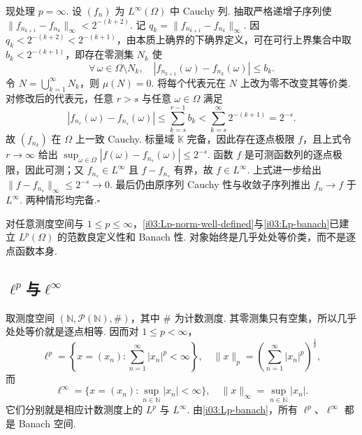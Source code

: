 \begin{FAProof}
现处理 \(\displaystyle p=\infty\). 设 \(\displaystyle (f_n)\) 为 \(\displaystyle L^\infty(\Omega)\) 中 Cauchy 列. 抽取严格递增子序列使 \(\displaystyle \|f_{n_{k+1}}-f_{n_k}\|_\infty<2^{-(k+2)}\).
记 \(\displaystyle q_k=\|f_{n_{k+1}}-f_{n_k}\|_\infty\). 因 \(\displaystyle q_k<2^{-(k+2)}<2^{-(k+1)}\)，由本质上确界的下确界定义，可在可行上界集合中取 \(\displaystyle b_k<2^{-(k+1)}\)，即存在零测集 \(\displaystyle N_k\) 使
\[
\forall\,\omega\in\Omega\setminus N_k,\quad |f_{n_{k+1}}(\omega)-f_{n_k}(\omega)|\leqslant b_k.
\]
令 \(\displaystyle N=\bigcup_{k=1}^{\infty}N_k\)，则 \(\displaystyle \mu(N)=0\). 将每个代表元在 \(\displaystyle N\) 上改为零不改变其等价类. 对修改后的代表元，任意 \(\displaystyle r>s\) 与任意 \(\displaystyle \omega\in\Omega\) 满足
\[
|f_{n_r}(\omega)-f_{n_s}(\omega)|
\leqslant\sum_{k=s}^{r-1}b_k
<\sum_{k=s}^{\infty}2^{-(k+1)}
=2^{-s}.
\]
故 \(\displaystyle (f_{n_k})\) 在 \(\displaystyle \Omega\) 上一致 Cauchy. 标量域 \(\displaystyle \mathbb K\) 完备，因此存在逐点极限 \(\displaystyle f\)，且上式令 \(\displaystyle r\to\infty\) 给出
\(\displaystyle \sup_{\omega\in\Omega}|f(\omega)-f_{n_s}(\omega)|\leqslant2^{-s}\).
函数 \(\displaystyle f\) 是可测函数列的逐点极限，因此可测；又 \(\displaystyle f_{n_s}\in L^\infty\) 且 \(\displaystyle f-f_{n_s}\) 有界，故 \(\displaystyle f\in L^\infty\). 上式进一步给出 \(\displaystyle \|f-f_{n_s}\|_\infty\leqslant2^{-s}\to0\). 最后仍由原序列 Cauchy 性与收敛子序列推出 \(\displaystyle f_n\to f\) 于 \(\displaystyle L^\infty\). 两种情形均完备.\hfill\(\square\)
\end{FAProof}

\begin{FAExample}[标准Banach函数空间模板]
对任意测度空间与 \(\displaystyle 1\leqslant p\leqslant\infty\)，\autoref{i03:Lp-norm-well-defined}与\autoref{i03:Lp-banach}已建立 \(\displaystyle L^p(\Omega)\) 的范数良定义性和 Banach 性. 对象始终是几乎处处等价类，而不是逐点函数本身.
\end{FAExample}

\subsection{\texorpdfstring{\(\displaystyle \ell^p\)}{ℓ^p}与\texorpdfstring{\(\displaystyle \ell^\infty\)}{ℓ^∞}}

\begin{FAExample}[序列空间]
取测度空间 \(\displaystyle (\mathbb N,\mathcal P(\mathbb N),\#)\)，其中 \(\displaystyle \#\) 为计数测度. 其零测集只有空集，所以几乎处处等价就是逐点相等. 因而对 \(\displaystyle 1\leqslant p<\infty\)，
\[
\ell^p
=\left\{x=(x_n):\sum_{n=1}^{\infty}|x_n|^p<\infty\right\},
\quad
\|x\|_p=\left(\sum_{n=1}^{\infty}|x_n|^p\right)^{\frac{1}{p}},
\]
而
\[
\ell^\infty
=\{x=(x_n):\sup_{n\in\mathbb N}|x_n|<\infty\},
\quad
\|x\|_\infty=\sup_{n\in\mathbb N}|x_n|.
\]
它们分别就是相应计数测度上的 \(\displaystyle L^p\) 与 \(\displaystyle L^\infty\). 由\autoref{i03:Lp-banach}，所有 \(\displaystyle \ell^p\)、\(\displaystyle \ell^\infty\) 都是 Banach 空间.
\end{FAExample}

